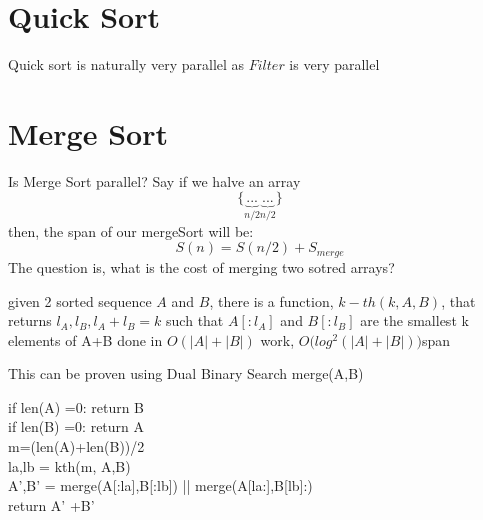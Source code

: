 \documentclass[12pt]{article}
\begin{document}

\section{Quick Sort}
Quick sort is naturally very parallel as $Filter$ is very parallel
\section{Merge Sort}
Is Merge Sort parallel? 
Say if we halve an array
$$\{\underbrace{...}_{n/2}\underbrace{...}_{n/2}\}$$
then, the span of our mergeSort will be:
$$S(n) = S(n/2) + S_{merge}$$
The question is, what is the cost of merging two sotred arrays?
\begin{claim}
given 2 sorted sequence $A$ and $B$, there is a function, $k-th(k,A,B)$, that returns $l_A,l_B, l_A +l_B = k$ such that $A[:l_A]$ and $B[:l_B]$ are the smallest k elements of A+B done in $O(|A|+|B|)$ work, $O(log^2{(|A|+|B|))} $span
\end{claim}
This can be proven using Dual Binary Search
merge(A,B)\\
\begin{algorithm}
if len(A) =0: 
return B\\
if len(B) =0: return A \\
m=(len(A)+len(B))/2 \\
la,lb = kth(m, A,B) \\
A',B' = merge(A[:la],B[:lb]) || merge(A[la:],B[lb]:)\\
return A' +B'
\end{algorithm}
\end{document}
